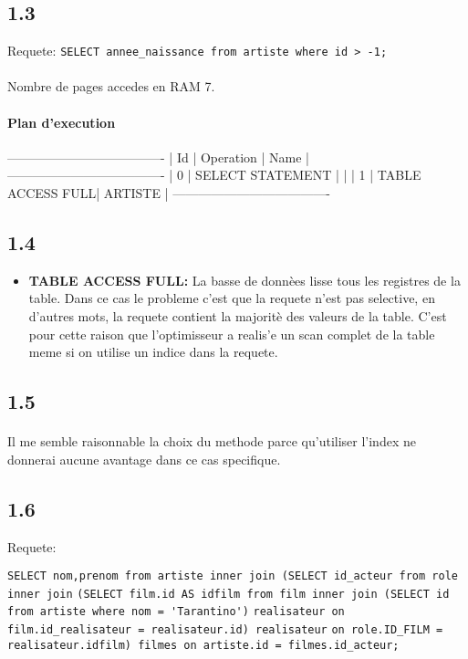 \documentclass{article}
\begin{document}
\subsection{1.3}
Requete:
\verb!SELECT annee_naissance from artiste where id > -1;! 
\paragraph{} Nombre de pages accedes en RAM 7.

\paragraph{ Plan d'execution}

-------------------------------------
| Id  | Operation         | Name    |
-------------------------------------
|   0 | SELECT STATEMENT  |         |
|   1 |  TABLE ACCESS FULL| ARTISTE |
-------------------------------------

\subsection{1.4}

\begin{itemize} 
\item \textbf{TABLE ACCESS FULL:} La basse de donnèes lisse tous les registres
de la table. Dans ce cas le probleme c'est que la requete n'est pas selective,
en d'autres mots, la requete contient la majoritè des valeurs de la table. C'est 
pour cette raison que l'optimisseur a realis'e un scan complet de la table meme
si on utilise un indice dans la requete. 
\end{itemize} 

\subsection{1.5}
\paragraph{} Il me semble raisonnable la choix du methode parce qu'utiliser l'index
ne donnerai aucune avantage dans ce cas specifique. 


\subsection{1.6}Requete:

\verb!SELECT nom,prenom from artiste inner join (SELECT id_acteur from role inner join!   
\verb!(SELECT film.id AS idfilm from film inner join (SELECT id from artiste where nom = 'Tarantino')! 
\verb!realisateur on film.id_realisateur = realisateur.id) realisateur! 
\verb!on role.ID_FILM = realisateur.idfilm) filmes on artiste.id = filmes.id_acteur;! 
\end{document}
